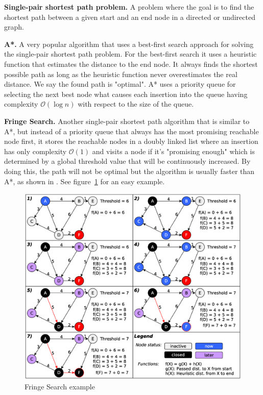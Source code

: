 \documentclass[letterpaper]{article}
\newcommand{\mypar}[1]{{\bf #1.}}
\begin{document}
\mypar{Single-pair shortest path problem}
A problem where the goal is to find the shortest path between a given start and an end node in a directed or undirected graph.

\mypar{A*}
A very popular algorithm that uses a best-first search approach for solving the single-pair shortest path problem. For the best-first search it uses a heuristic function that estimates the distance to the end node. It always finds the shortest possible path as long as the heuristic function never overestimates the real distance. We say the found path is "optimal". A* uses a priority queue for selecting the next best node what causes each insertion into the queue having complexity $\mathcal{O}(\log n)$ with respect to the size of the queue.

\mypar{Fringe Search}
Another single-pair shortest path algorithm that is similar to A*, but instead of a priority queue that always has the most promising reachable node first, it stores the reachable nodes in a doubly linked list where an insertion has only complexity $\mathcal{O}(1)$ and visits a node if it's "promising enough" which is determined by a global threshold value that will be continuously increased. By doing this, the path will not be optimal but the algorithm is usually faster than A*, as shown in \cite{fringe:05}. See figure~\ref{fig:algo} for an easy example.
\begin{figure}[h]\centering
  \includegraphics[scale=0.245]{fringe_rep.eps}
  \caption{Fringe Search example \label{fig:algo}}
\end{figure}
\end{document}
